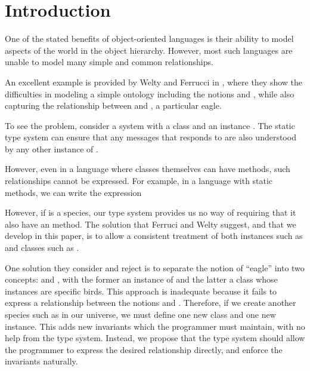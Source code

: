\documentclass{acm-sigplan}
\begin{document}
\section{Introduction}
One of the stated benefits of object-oriented languages is their
ability to model aspects of the world in the object hierarchy.
However, most such languages are unable to model many simple and
common relationships. 

An excellent example is provided by Welty and Ferrucci in \cite{FW96}, where
they show the difficulties in modeling a simple
ontology including the notions {} and {}, while
also capturing the relationship between {} and {},
a particular eagle.  

To see the problem, consider a system with a class  and an
instance .  The static type system can ensure that any
messages that  responds to are also understood by any other
instance of .  

However, even in a language where classes themselves can have methods,
such relationships cannot be expressed.  For example, in a language
with static methods, we can write the expression

However, if  is a species, our type system provides us no
way of requiring that it also have an  method.  The
solution that Ferruci and Welty suggest, and that we develop in this
paper, is to allow a consistent treatment of both instances such as
 and classes such as .

One solution they consider and reject is to separate the notion of
``eagle'' into two concepts: {} and {}, with
the former an instance of {} and the latter a class whose
instances are specific birds.  This approach is inadequate because it
fails to express a relationship between the notions {}
and {}.  Therefore, if we create another species such as
 in our universe, we must define one new class and one new
instance.  This adds new invariants which the programmer must
maintain, with no help from the type system.  Instead, we propose that
the type system should allow the programmer to express the desired
relationship directly, and enforce the invariants naturally.  
\end{document}
